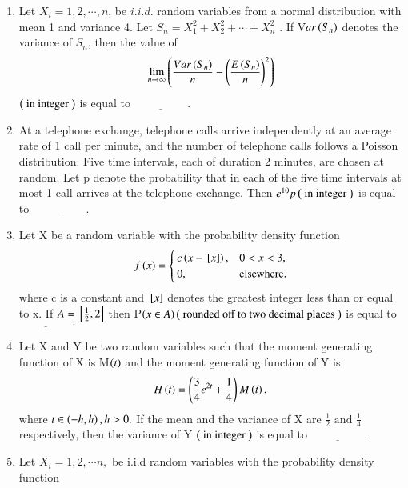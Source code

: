 \documentclass[journal]{IEEEtran}
\begin{document}
\begin{enumerate} [start=27]
\item Let $X_{i} = 1, 2,\cdots, n$, be $i.i.d.$ random variables from a normal distribution with
mean 1 and variance 4. Let $S_{n}=X_{1}^{2}+X_{2}^{2}+\cdots+X_{n}^{2}$
. If V$ar\left(S_{n}\right)$ denotes the
variance of $S_{n}$, then the value of 
\begin{align*}
    \lim_{n\to\infty}\left(\frac{Var\left(S_{n}\right)}{n}-\left(\frac{E\left(S_{n}\right)}{n}\right)^{2}\right)
\end{align*}
$\left(\text{ in integer }\right)$ is equal to $\underline{\hspace{2cm}}.$
\bigskip
\item At a telephone exchange, telephone calls arrive independently at an average rate of 1 call per minute, and the number of telephone calls follows a Poisson distribution.
Five time intervals, each of duration 2 minutes, are chosen at random. Let p denote the probability that in each of the five time intervals at most 1 call arrives at the telephone exchange. Then $e^{10}p\left(\text{ in integer }\right)$ is equal to $\underline{\hspace{2cm}}.$
\bigskip
\item Let X be a random variable with the probability density function 
\begin{align*}
    f\left(x\right) = 
\begin{cases} 
c \left(x - {}\left[x\right]\right), & 0 < x < 3, \\
0, & \text{elsewhere}.
\end{cases}
\end{align*}
where c is a constant and ${}\left[x\right]$ denotes the greatest integer less than or equal to x. If $A={}\left[\frac{1}{2},2\right]$ then P$\left(x\in A\right) \left(\text{ rounded off to two decimal places }\right)$ is equal to $\underline{\hspace{2cm}}.$
\bigskip
\item Let X and Y be two random variables such that the moment generating function of X is M$\left(t\right)$ and the moment generating function of Y is
\begin{align*}
    H\left(t\right)=\left(\frac{3}{4}e^{2t}+\frac{1}{4}\right)M\left(t\right),
\end{align*}
where $t\in\left(-h,h\right),h>0.$ If the mean and the variance of  X are $\frac{1}{2} \text{ and }\frac{1}{4}$ respectively, then the variance of Y $\left(\text{ in integer }\right)$ is equal to $\underline{\hspace{2cm}}.$
\bigskip
\item Let $X_{i}=1,2,\cdots n,$ be i.i.d random variables with the probability density function 

\end{enumerate}
\end{document}
